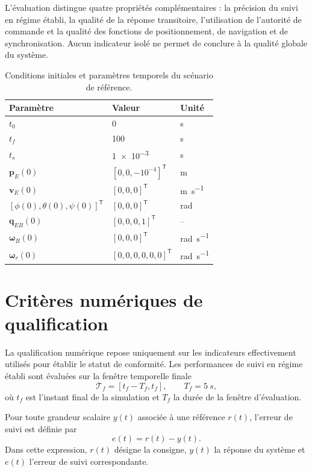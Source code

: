 \documentclass[11pt,a4paper,oneside]{report}
\newcommand{\vect}[1]{\bm{#1}}
\newcommand{\trans}{^{\mathsf T}}
\begin{document}
	L'évaluation distingue quatre propriétés complémentaires : la précision du suivi en régime établi, la qualité de la réponse transitoire, l'utilisation de l'autorité de commande et la qualité des fonctions de positionnement, de navigation et de synchronisation. Aucun indicateur isolé ne permet de conclure à la qualité globale du système.
	

	
\begin{table}[H]
	\centering
	\caption{Conditions initiales et paramètres temporels du scénario de référence.}
	\label{tab_initial_conditions}
	\begin{tabularx}{\textwidth}{@{}L{5.0cm}L{5.5cm}L{2.5cm}@{}}
		\toprule
		\textbf{Paramètre} & \textbf{Valeur} & \textbf{Unité}\\
		\midrule
		$t_0$ & \num{0} & \si{s}\\
		$t_f$ & \num{100} & \si{s}\\
		$t_s$ & \num{1e-3} & \si{s}\\
		$\vect p_E(0)$ & $[0,0,-10^{-4}]\trans$ & \si{m}\\
		$\vect v_E(0)$ & $[0,0,0]\trans$ & \si{m.s^{-1}}\\
		$[\phi(0),\theta(0),\psi(0)]\trans$ & $[0,0,0]\trans$ & \si{rad}\\
		$\vect q_{EB}(0)$ & $[0,0,0,1]\trans$ & --\\
		$\vect\omega_B(0)$ & $[0,0,0]\trans$ & \si{rad.s^{-1}}\\
		$\vect\omega_r(0)$ & $[0,0,0,0,0,0]\trans$ & \si{rad.s^{-1}}\\
		\bottomrule
	\end{tabularx}
\end{table}
	
\section{Critères numériques de qualification}

La qualification numérique repose uniquement sur les indicateurs effectivement utilisés pour établir le statut de conformité. Les performances de suivi en régime établi sont évaluées sur la fenêtre temporelle finale
\begin{equation}
	\mathcal{T}_f=[t_f-T_f,t_f],
	\qquad
	T_f=\SI{5}{s},
	\label{eq_final_evaluation_window}
\end{equation}
où $t_f$ est l'instant final de la simulation et $T_f$ la durée de la fenêtre d'évaluation.

Pour toute grandeur scalaire $y(t)$ associée à une référence $r(t)$, l'erreur de suivi est définie par
\begin{equation}
	e(t)=r(t)-y(t).
	\label{eq_qualification_tracking_error}
\end{equation}
Dans cette expression, $r(t)$ désigne la consigne, $y(t)$ la réponse du système et $e(t)$ l'erreur de suivi correspondante.
\end{document}
